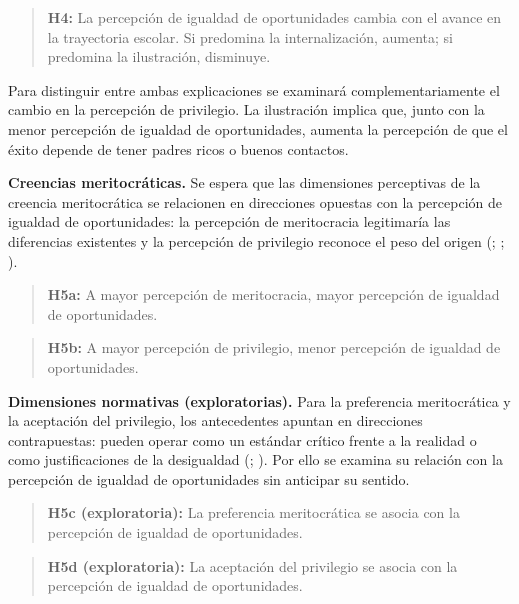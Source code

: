 \documentclass[
  spanish,
  a4paper,
  oneside]{scrbook}
\begin{document}
\begin{quote}
\textbf{H4:} La percepción de igualdad de oportunidades cambia con el
avance en la trayectoria escolar. Si predomina la internalización,
aumenta; si predomina la ilustración, disminuye.
\end{quote}

Para distinguir entre ambas explicaciones se examinará
complementariamente el cambio en la percepción de privilegio. La
ilustración implica que, junto con la menor percepción de igualdad de
oportunidades, aumenta la percepción de que el éxito depende de tener
padres ricos o buenos contactos.

\textbf{Creencias meritocráticas.} Se espera que las dimensiones
perceptivas de la creencia meritocrática se relacionen en direcciones
opuestas con la percepción de igualdad de oportunidades: la percepción
de meritocracia legitimaría las diferencias existentes y la percepción
de privilegio reconoce el peso del origen
(;
;
).

\begin{quote}
\textbf{H5a:} A mayor percepción de meritocracia, mayor percepción de
igualdad de oportunidades.
\end{quote}

\begin{quote}
\textbf{H5b:} A mayor percepción de privilegio, menor percepción de
igualdad de oportunidades.
\end{quote}

\textbf{Dimensiones normativas (exploratorias).} Para la preferencia
meritocrática y la aceptación del privilegio, los antecedentes apuntan
en direcciones contrapuestas: pueden operar como un estándar crítico
frente a la realidad o como justificaciones de la desigualdad
(;
). Por ello se
examina su relación con la percepción de igualdad de oportunidades sin
anticipar su sentido.

\begin{quote}
\textbf{H5c (exploratoria):} La preferencia meritocrática se asocia con
la percepción de igualdad de oportunidades.
\end{quote}

\begin{quote}
\textbf{H5d (exploratoria):} La aceptación del privilegio se asocia con
la percepción de igualdad de oportunidades.
\end{quote}
\end{document}
